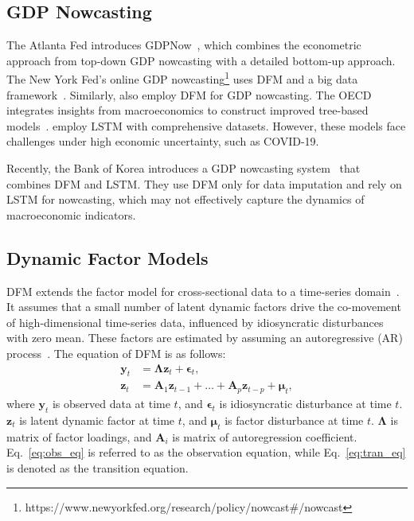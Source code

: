 \documentclass[sigconf]{acmart}
\begin{document}
\subsection{GDP Nowcasting}
The Atlanta Fed introduces GDPNow~\cite{higgins2014gdpnow}, which combines the econometric approach from top-down GDP nowcasting with a detailed bottom-up approach. 
The New York Fed's online GDP nowcasting\footnote{https://www.newyorkfed.org/research/policy/nowcast\#/nowcast} uses DFM and a big data framework~\cite{baker2023reintroducing,almuzara2023new,blazqueznowcasting}.
Similarly, \citet{hayashi2023nowcasting} also employ DFM for GDP nowcasting.
The OECD integrates insights from macroeconomics to construct improved tree-based models~\cite{woloszko2020adaptive}.
\citet{wu2021data} employ LSTM with comprehensive datasets.
However, these models face challenges under high economic uncertainty, such as COVID-19.

Recently, the Bank of Korea introduces a GDP nowcasting system~\cite{lee2022d} that combines DFM and LSTM. They use DFM only for data imputation and rely on LSTM for nowcasting, which may not effectively capture the dynamics of macroeconomic indicators.

\subsection{Dynamic Factor Models}

DFM extends the factor model for cross-sectional data to a time-series domain~\cite{geweke1977dynamic}. It assumes that a small number of latent dynamic factors drive the co-movement of high-dimensional time-series data, influenced by idiosyncratic disturbances with zero mean. These factors are estimated by assuming an autoregressive (AR) process~\cite{stock2011dynamic}.
The equation of DFM is as follows:
\begin{align}\label{eq:obs_eq}
    \mathbf{y}_t &= \mathbf{\Lambda} \mathbf{z}_t + \bm{\epsilon}_t, \\
    \mathbf{z}_t &= \mathbf{A}_1\mathbf{z}_{t-1} + \dots + \mathbf{A}_p\mathbf{z}_{t-p} + \bm{\mu}_t, \label{eq:tran_eq}
\end{align} where $\mathbf{y}_t$ is observed data at time $t$, and $\bm{\epsilon}_t$ is idiosyncratic disturbance at time $t$. $\mathbf{z}_t$ is latent dynamic factor at time $t$, and $\bm{\mu}_t$ is factor disturbance at time $t$. $\mathbf{\Lambda}$ is matrix of factor loadings, and $\mathbf{A}_i$ is matrix of autoregression coefficient. Eq.~\eqref{eq:obs_eq} is referred to as the observation equation, while Eq.~\eqref{eq:tran_eq} is denoted as the transition equation.
\end{document}
